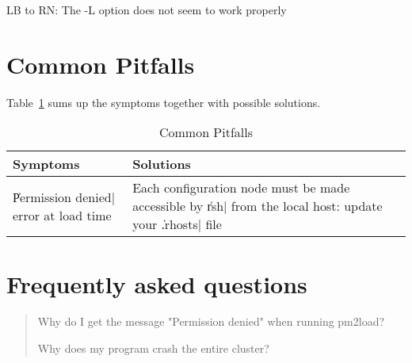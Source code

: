 
\begin{note}
  LB to RN: The -L option does not seem to work properly
\end{note}


\section{Common Pitfalls}
\label{sec:commonpitfalls}

Table~\ref{tbl:pitfalls} sums up the symptoms together with
possible solutions.
\begin{table}[p]
\caption{Common Pitfalls\label{tbl:pitfalls}}
\begin{center}
\begin{tabular}{|p{0.3\linewidth}|p{0.7\linewidth}|}                          \hline
Symptoms & 
Solutions                   
\\ 
\hline
\|Permission denied| error at load time & 
Each configuration node must be made
accessible by \|rsh| from the local host: update your
\|.rhosts| file                                  
\\ 
\hline
\end{tabular}
\end{center}
\end{table}

\section{Frequently asked questions}
\label{sec:faq}


\begin{quote}
  Why do I get the message "Permission denied" when running pm2load?
  
  Why does my program crash the entire cluster?
\end{quote}
